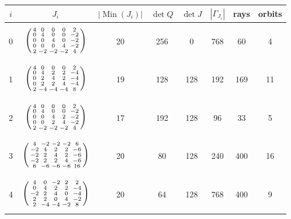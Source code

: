 \documentclass[11pt]{amsart}
\theoremstyle{definition}
\theoremstyle{remark}
\numberwithin{equation}{section}
\numberwithin{table}{section}
\numberwithin{figure}{section}
\newcommand{\Min}{\operatorname{Min}}
\begin{document}
\begin{table}[t]
\centering
\small
\renewcommand{\arraystretch}{1.0}
\begin{tabular}{@{}c c c c c c c c@{}}
\toprule
$i$ & $J_i$ & $|\Min(J_i)|$ & $\det Q$ & $\det J$ & $|\Gamma_{J_i}|$ & rays & orbits\\
\midrule
0 & $\vphantom{\rule[-19pt]{0pt}{42pt}}\left(\begin{smallmatrix}4&0&0&0&2\\0&4&0&0&-2\\0&0&4&0&-2\\0&0&0&4&-2\\2&-2&-2&-2&4\end{smallmatrix}\right)$ & 20 & 256 & 0 & 768 & 60 & 4\\
1 & $\vphantom{\rule[-19pt]{0pt}{42pt}}\left(\begin{smallmatrix}4&0&0&0&2\\0&4&2&2&-4\\0&2&4&2&-4\\0&2&2&4&-4\\2&-4&-4&-4&8\end{smallmatrix}\right)$ & 19 & 128 & 128 & 192 & 169 & 11\\
2 & $\vphantom{\rule[-19pt]{0pt}{42pt}}\left(\begin{smallmatrix}4&0&0&0&2\\0&4&0&0&-2\\0&0&4&2&-2\\0&0&2&4&-2\\2&-2&-2&-2&4\end{smallmatrix}\right)$ & 17 & 192 & 128 & 96 & 33 & 5\\
3 & $\vphantom{\rule[-19pt]{0pt}{42pt}}\left(\begin{smallmatrix}4&-2&-2&-2&6\\-2&4&2&2&-6\\-2&2&4&2&-6\\-2&2&2&4&-6\\6&-6&-6&-6&16\end{smallmatrix}\right)$ & 20 & 80 & 128 & 240 & 400 & 16\\
4 & $\vphantom{\rule[-19pt]{0pt}{42pt}}\left(\begin{smallmatrix}4&0&-2&2&2\\0&4&2&2&-4\\-2&2&4&0&-4\\2&2&0&4&-2\\2&-4&-4&-2&8\end{smallmatrix}\right)$ & 20 & 64 & 128 & 768 & 400 & 9\\

\end{tabular}
\end{table}
\end{document}
